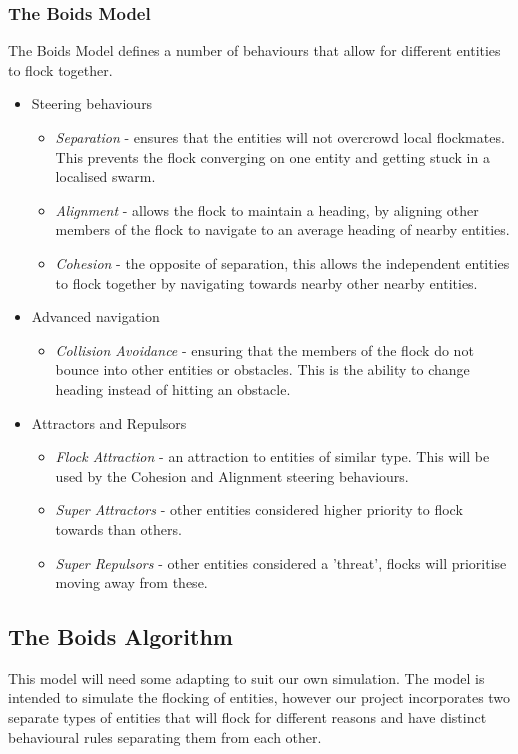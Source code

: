 \subsubsection{The Boids Model}
The Boids Model defines a number of behaviours that allow for different entities to flock together.
\begin{itemize}
	\item Steering behaviours
	\begin{itemize}
		\item \emph{Separation} - ensures that the entities will not overcrowd local flockmates. This prevents the flock converging on one entity and getting stuck in a localised swarm.
		\item \emph{Alignment} - allows the flock to maintain a heading, by aligning other members of the flock to navigate to an average heading of nearby entities.
		\item \emph{Cohesion} - the opposite of separation, this allows the independent entities to flock together by navigating towards nearby other nearby entities.
	\end{itemize}
	\item Advanced navigation
	\begin{itemize}
		\item \emph{Collision Avoidance} - ensuring that the members of the flock do not bounce into other entities or obstacles. This is the ability to change heading instead of hitting an obstacle.
	\end{itemize}
	\item Attractors and Repulsors
	\begin{itemize}
		\item \emph{Flock Attraction} - an attraction to entities of similar type. This will be used by the Cohesion and Alignment steering behaviours.
		\item \emph{Super Attractors} - other entities considered higher priority to flock towards than others.
		\item \emph{Super Repulsors} - other entities considered a 'threat', flocks will prioritise moving away from these.
	\end{itemize}
\end{itemize}

\subsection{The Boids Algorithm}
This model will need some adapting to suit our own simulation. The model is intended to simulate the flocking of entities, however our project incorporates two separate types of entities that will flock for different reasons and have distinct behavioural rules separating them from each other.

